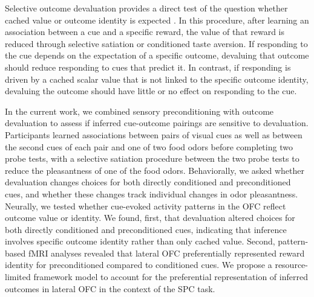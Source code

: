 \documentclass[9pt,twocolumn,twoside]{pnas-new}
\begin{document}
Selective outcome devaluation provides a direct test of the question whether cached value or outcome identity is expected \cite{HowRey2020,liu2025distinct,hart20}. In this procedure, after learning an association between a cue and a specific reward, the value of that reward is reduced through selective satiation or conditioned taste aversion. If responding to the cue depends on the expectation of a specific outcome, devaluing that outcome should reduce responding to cues that predict it. In contrast, if responding is driven by a cached scalar value that is not linked to the specific outcome identity, devaluing the outcome should have little or no effect on responding to the cue.




In the current work, we combined sensory preconditioning \cite{Brogden39} with outcome devaluation \cite{HowRey2020,liu2025distinct} to assess if inferred cue-outcome pairings are sensitive to devaluation. Participants learned associations between pairs of visual cues as well as between the second cues of each pair and one of two food odors before completing two probe tests, with a selective satiation procedure between the two probe tests to reduce the pleasantness of one of the food odors. Behaviorally, we asked whether devaluation changes choices for both directly conditioned and preconditioned cues, and whether these changes track individual changes in odor pleasantness. Neurally, we tested whether cue-evoked activity patterns in the OFC reflect outcome value or identity. We found, first, that devaluation altered choices for both directly conditioned and preconditioned cues, indicating that inference involves specific outcome identity rather than only cached value. Second, pattern-based fMRI analyses revealed that lateral OFC preferentially represented reward identity for preconditioned compared to conditioned cues. We propose a resource-limited framework model to account for the preferential representation of inferred outcomes in lateral OFC in the context of the SPC task.
\end{document}
